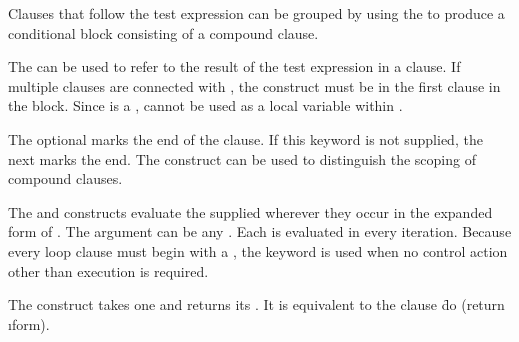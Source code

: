  
 
Clauses that follow the test expression can be grouped by using 
the   to produce a conditional block consisting of 
a compound clause.
 
The   can be used to refer to the result of the
test expression in a clause.  If multiple clauses are connected 
with ,
the  construct must be in the first clause in the block.  Since 
is a ,  cannot be used as a local variable within
.
 
 
 
The optional   marks the end of the clause.  If this
keyword is not supplied, the next  marks the end.  The construct
 can be used to distinguish the scoping of compound clauses.
 
 
 

 
 
The  and  constructs 
evaluate the 
supplied  
wherever they occur in the expanded form of .
 The  argument can be any  .
Each  is evaluated in every iteration.
Because every loop clause must begin with a , 
the keyword  is used when no control action other than execution is 
required.
 
 
The  construct takes one  and returns its .  It 
is equivalent to the clause \f{do (return \i{form})}.

